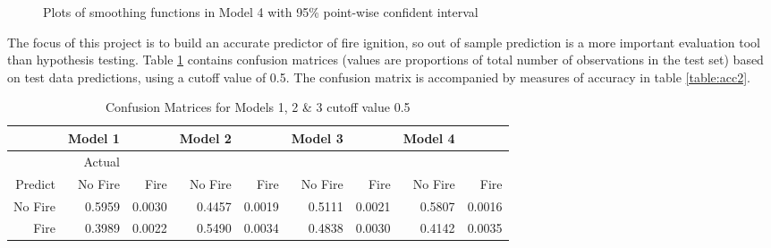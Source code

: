 \documentclass[11pt,a4paper]{article}
\begin{document}
\begin{figure}[!ht]
\null\vfill\noindent
\hfill
\vfill
\hfill
\vfill
\hfill
\vfill
\null
	\caption{Plots of smoothing functions in Model 4 with 95\% point-wise confident interval} 
	\label{fig:gam_pl} 
\end{figure}

The focus of this project is to build an accurate predictor of fire ignition, so out of sample prediction is a more important evaluation tool than hypothesis testing. Table \ref{table:cm2} contains confusion matrices (values are proportions of total number of observations in the test set) based on test data predictions, using a cutoff value of 0.5. The confusion matrix is accompanied by measures of accuracy in table \ref{table:acc2}. 

\begin{table}[!ht]
	\centering
	\begin{tabular}{r|rr|rr|rr|rr}
		\toprule
		& Model 1 &  & Model 2 &  & Model 3 &  & Model 4 & \\ 
		\midrule
		& Actual   &  &  &  &  & & & \\ 
		Predict & No Fire & Fire & No Fire & Fire & No Fire & Fire & No Fire & Fire\\ 
		\midrule
No Fire & 0.5959 & 0.0030 & 0.4457 & 0.0019 & 0.5111 & 0.0021 & 0.5807 & 0.0016 \\ 
Fire & 0.3989 & 0.0022 & 0.5490 & 0.0034 & 0.4838 & 0.0030 & 0.4142 & 0.0035 \\ 
		\bottomrule
	\end{tabular}
	\caption{Confusion Matrices for Models 1, 2 \& 3 cutoff value 0.5}
	\label{table:cm2}
\end{table}
\end{document}
